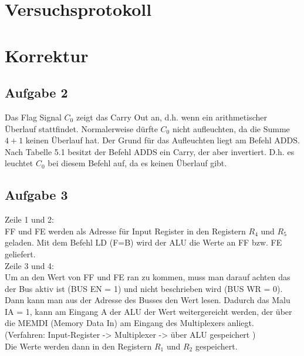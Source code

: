 \documentclass[paper=a4, fontsize=11pt]{scrartcl}
\numberwithin{equation}{section}
\numberwithin{figure}{section}
\numberwithin{table}{section}
\begin{document}

\newpage

\section{Versuchsprotokoll}


\newpage

\section{Korrektur}

\subsection{Aufgabe 2}

Das Flag Signal $C_{0}$ zeigt das Carry Out an, d.h. wenn ein arithmetischer Überlauf stattfindet. Normalerweise dürfte $C_{0}$ nicht aufleuchten, da die Summe $4+1$ keinen Überlauf hat. Der Grund für das Aufleuchten liegt am Befehl ADDS. Nach Tabelle 5.1 besitzt der Befehl ADDS ein Carry, der aber invertiert. D.h. es leuchtet $C_{0}$ bei diesem Befehl auf, da es keinen Überlauf gibt.

\subsection{Aufgabe 3}

Zeile 1 und 2: \\
FF und FE werden als Adresse für Input Register in den Registern $R_{4}$ und $R_{5}$ geladen. Mit dem Befehl LD (F=B) wird der ALU die Werte an FF bzw. FE geliefert. \\

Zeile 3 und 4: \\
Um an den Wert von FF und FE ran zu kommen, muss man darauf achten das der Bus aktiv ist (BUS EN = 1) und nicht beschrieben wird (BUS WR = 0). Dann kann man aus der Adresse des Busses den Wert lesen. Dadurch das Malu IA = 1, kann am Eingang A der ALU der Wert weitergereicht werden, der über die MEMDI (Memory Data In) am Eingang des Multiplexers anliegt. \\
(Verfahren: Input-Register -> Multiplexer -> über ALU gespeichert ) \\
Die Werte werden dann in den Registern $R_{1}$ und $R_{2}$ gespeichert.
\end{document}
